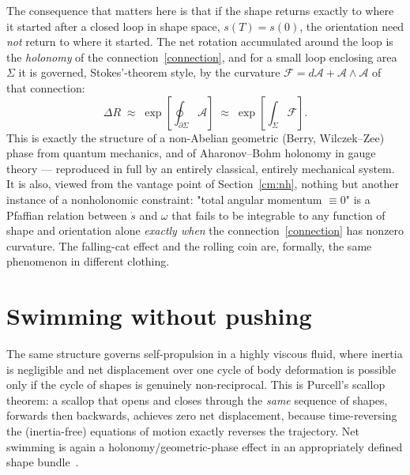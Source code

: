 The consequence that matters here is that if the shape returns
exactly to where it started after a closed loop in shape space,
$s(T) = s(0)$, the orientation need \emph{not} return to where it
started. The net rotation accumulated around the loop is the
\emph{holonomy} of the connection~\eqref{connection}, and for a
small loop enclosing area $\Sigma$ it is governed, Stokes'-theorem
style, by the curvature $\mathcal F = d\mathcal A + \mathcal
A\wedge\mathcal A$ of that connection:
\begin{equation}
  \Delta R \;\approx\; \exp\!\left[\oint_{\partial\Sigma}\mathcal
  A\right] \;\approx\; \exp\!\left[\int_{\Sigma}\mathcal F\right].
  \label{holonomy}
\end{equation}
This is exactly the structure of a non-Abelian geometric (Berry,
Wilczek--Zee) phase from quantum mechanics, and of Aharonov--Bohm
holonomy in gauge theory --- reproduced in full by an entirely
classical, entirely mechanical system. It is also, viewed from the
vantage point of Section~\ref{cm:nh}, nothing but another
instance of a nonholonomic constraint: "total angular momentum
$\equiv 0$" is a Pfaffian relation between $\dot s$ and $\omega$ that
fails to be integrable to any function of shape and orientation
alone \emph{exactly when} the connection~\eqref{connection} has
nonzero curvature. The falling-cat effect and the rolling coin are,
formally, the same phenomenon in different clothing.

\section{Swimming without pushing}

The same structure governs self-propulsion in a highly viscous
fluid, where inertia is negligible and net displacement over one
cycle of body deformation is possible only if the cycle of shapes is
genuinely non-reciprocal. This is Purcell's scallop theorem: a
scallop that opens and closes through the \emph{same} sequence of
shapes, forwards then backwards, achieves zero net displacement,
because time-reversing the (inertia-free) equations of motion
exactly reverses the trajectory. Net swimming is again a
holonomy/geometric-phase effect in an appropriately defined shape
bundle~\cite{shapere+wilczek-swim}.

